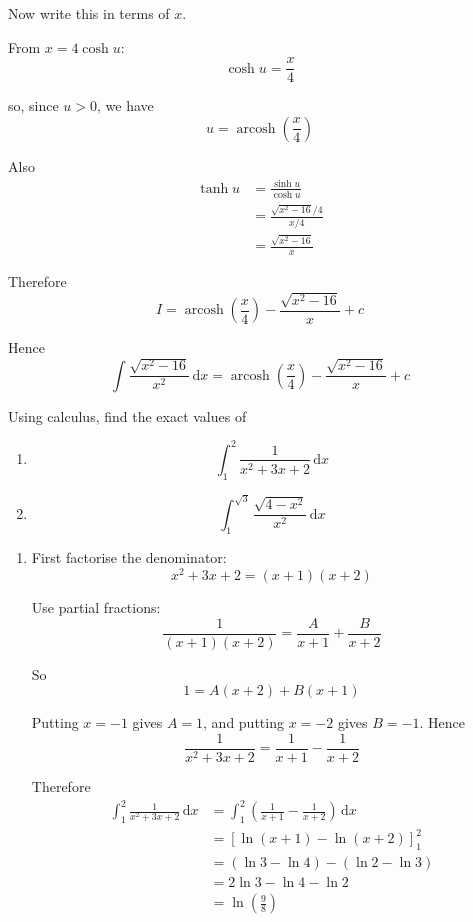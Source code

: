 \documentclass[leqno]{article}
\begin{document}
\begin{enumerate}[
  label=\textbf{\arabic*.},
  leftmargin=*,
  topsep=0pt,
  partopsep=0pt,
  parsep=0pt
]
\begin{djsSolution}
Now write this in terms of $x$.

From $x=4\cosh u$:
\[
\cosh u=\frac{x}{4}
\]

so, since $u>0$, we have
\[
u=\operatorname{arcosh}\left(\frac{x}{4}\right)
\]

Also
\begin{align*}
\tanh u
&=\frac{\sinh u}{\cosh u} \\
&=\frac{\sqrt{x^2-16}/4}{x/4} \\
&=\frac{\sqrt{x^2-16}}{x}
\end{align*}

Therefore
\[
I=\operatorname{arcosh}\left(\frac{x}{4}\right)-\frac{\sqrt{x^2-16}}{x}+c
\]

Hence
\[
\int \frac{\sqrt{x^2 - 16}}{x^2}\,\mathrm{d}x = \operatorname{arcosh}\left(\frac{x}{4}\right) - \frac{\sqrt{x^2 - 16}}{x} + c
\]

\end{djsSolution}


\newpage

\questionitem

Using calculus, find the exact values of \\
\begin{enumerate}[label=(\roman*)]
  \item
  \[
  \int_1^2 \frac{1}{x^2 + 3x + 2}\,\mathrm{d}x
  \]
  \item
  \[
  \int_1^{\sqrt{3}} \frac{\sqrt{4 - x^2}}{x^2}\,\mathrm{d}x
  \]
\end{enumerate}

\vspace*{10pt}

\begin{djsSolution}
\begin{enumerate}[label=\textbf{(\roman*)}]
\item First factorise the denominator:
\[
x^2+3x+2=(x+1)(x+2)
\]

Use partial fractions:
\[
\frac{1}{(x+1)(x+2)}=\frac{A}{x+1}+\frac{B}{x+2}
\]

So
\[
1=A(x+2)+B(x+1)
\]

Putting $x=-1$ gives $A=1$, and putting $x=-2$ gives $B=-1$. Hence
\[
\frac{1}{x^2+3x+2}=\frac{1}{x+1}-\frac{1}{x+2}
\]

Therefore
\begin{align*}
\int_1^2 \frac{1}{x^2+3x+2}\,\mathrm{d}x
&=\int_1^2 \left(\frac{1}{x+1}-\frac{1}{x+2}\right)\,\mathrm{d}x\\
&=\left[\ln(x+1)-\ln(x+2)\right]_1^2\\
&=(\ln 3-\ln 4)-(\ln 2-\ln 3)\\
&=2\ln 3-\ln 4-\ln 2\\
&=\ln\left(\frac{9}{8}\right)
\end{align*}


\end{enumerate}
\end{djsSolution}
\end{enumerate}
\end{document}
